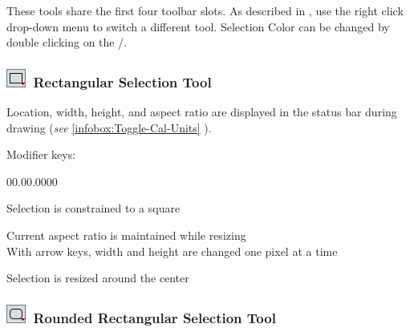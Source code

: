 These tools share the first four toolbar slots. As described in ,
use the right click drop-down menu to switch a different tool. Selection
Color can be changed by double clicking on the /.


\subsubsection[Rectangular Selection Tool]{\noindent \textsf{\protect\includegraphics[bb=0bp 5bp 20bp 20bp,scale=0.6]{images/tools/Rectangle}}~Rectangular
Selection Tool\label{sub:Rectangular-Selection-Tool}}

\noindent Location, width, height, and aspect ratio are displayed
in the status bar during drawing (\emph{see} \ref{infobox:Toggle-Cal-Units}
).

Modifier keys:
\begin{lyxlist}{00.00.0000}
\item [{\mykeystroke{Shift}}] \noindent Selection is constrained to a
square
\item [{\mykeystroke{Alt}}] \noindent Current aspect
ratio is maintained while resizing\\
With arrow keys, width and height are changed one pixel at a time
\item [{\mykeystroke{Ctrl}}] \noindent Selection is resized around the
center
\end{lyxlist}



\subsubsection[Rounded Rectangular Selection Tool]{\noindent \textsf{\protect\includegraphics[bb=0bp 5bp 20bp 20bp,scale=0.6]{images/tools/RoundRect}}~Rounded
Rectangular Selection Tool\label{sub:Round-Rectangular-Selection}\improvement{}}

